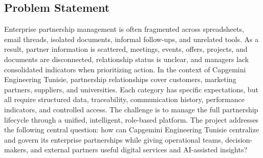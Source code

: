 \subsection{Problem Statement}
Enterprise partnership management is often fragmented across spreadsheets, email threads, isolated documents, informal follow-ups, and unrelated tools. As a result, partner information is scattered, meetings, events, offers, projects, and documents are disconnected, relationship status is unclear, and managers lack consolidated indicators when prioritizing action. In the context of Capgemini Engineering Tunisie, partnership relationships cover customers, marketing partners, suppliers, and universities. Each category has specific expectations, but all require structured data, traceability, communication history, performance indicators, and controlled access. The challenge is to manage the full partnership lifecycle through a unified, intelligent, role-based platform. The project addresses the following central question: how can Capgemini Engineering Tunisie centralize and govern its enterprise partnerships while giving operational teams, decision-makers, and external partners useful digital services and AI-assisted insights?
